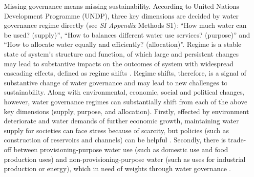 \documentclass[9pt, twocolumn, twoside, lineno]{pnas-new}
\begin{document}
\label{introduction-section-2}
Missing governance means missing sustainability.
According to United Nations Development Programme (UNDP), three key dimensions are decided by water governance regime directly (see \textit{SI Appendix} Methods S1): ``How much water can be used? (supply)'', ``How to balances different water use services? (purpose)'' and ``How to allocate water equally and efficiently? (allocation)''.
Regime is a stable state of system’s structure and function, of which large and persistent changes may lead to substantive impacts on the outcomes of system with widespread cascading effects, defined as regime shifts 
\cite{rochaCascadingRegimeShifts2018,schefferCatastrophicRegimeShifts2003, schefferCatastrophicShiftsEcosystems2001}.
Regime shifts, therefore, is a signal of substantive change of water governance and may lead to new challenges to sustainability.
Along with environmental, economic, social and political changes, however, water governance regimes can substantially shift from each of the above key dimensions (supply, purpose, and allocation).
Firstly, effected by environment deteriorate and water demands of further economic growth, maintaining water supply for societies can face stress because of scarcity, but policies (such as construction of reservoirs and channels) can be helpful
\cite{postelHumanAppropriationRenewable1996, greveGlobalAssessmentWater2018, qinFlexibilityIntensityGlobal2019}.
Secondly, there is trade-off between provisioning-purpose water use (such as domestic use and food production uses) and non-provisioning-purpose water (such as uses for industrial production or energy), which in need of weights through water governance
\cite{liuWaterScarcityAssessments2017, florkeWaterCompetitionCities2018}.
\end{document}
